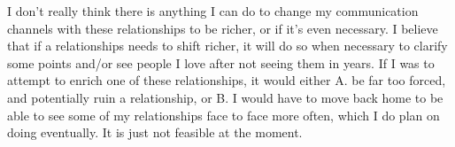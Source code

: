 \documentclass[12pt]{article}
\begin{document}
\par
I don't really think there is anything I can do to change my communication channels with these relationships to be richer, or if it's even necessary. I believe that if a relationships needs to shift richer, it will do so when necessary to clarify some points and/or see people I love after not seeing them in years. If I was to attempt to enrich one of these relationships, it would either A. be far too forced, and potentially ruin a relationship, or B. I would have to move back home to be able to see some of my relationships face to face more often, which I do plan on doing eventually. It is just not feasible at the moment.
\end{document}
